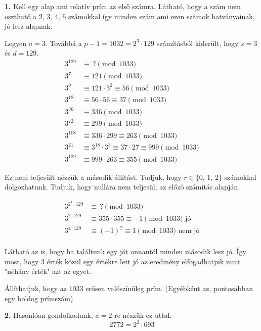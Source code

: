 \begin{solution}
\hspace{0em}\vspace{1em}

\textbf{1.} Kell egy alap ami relatív prím az első számra. Látható,
hogy a szám nem osztható a $2,\,3,\,4,\,5$ számokkal így minden szám
ami ezen számok hatványainak, jó lesz alapnak.

Legyen $a=3$. Továbbá a $p-1=1032=2^{3}\cdot129$ számításból kiderült,
hogy $s=3$ és $d=129$. 
\begin{align*}
3^{129} & \equiv\,?\pmod{1033}\\
3^{7} & \equiv121\pmod{1033}\\
3^{9} & \equiv121\cdot3^{2}\equiv56\pmod{1033}\\
3^{18} & \equiv56\cdot56\equiv37\pmod{1033}\\
3^{36} & \equiv336\pmod{1033}\\
3^{72} & \equiv299\pmod{1033}\\
3^{108} & \equiv336\cdot299\equiv263\pmod{1033}\\
3^{21} & \equiv3^{18}\cdot3^{3}\equiv37\cdot27\equiv999\pmod{1033}\\
3^{129} & \equiv999\cdot263\equiv355\pmod{1033}
\end{align*}

Ez nem teljesült nézzük a második állítást. Tudjuk, hogy $r\in\{0,\,1,\,2\}$
számokkal dolgozhatunk. Tudjuk, hogy nullára nem teljesül, az előző
számítás alapján.

\begin{align*}
3^{2^{1}\cdot129} & \equiv\,?\pmod{1033}\\
3^{2\cdot129} & \equiv355\cdot355\equiv-1\pmod{1033}\text{ jó}\\
3^{4\cdot129} & \equiv(-1)^{2}\equiv1\pmod{1033}\text{ nem jó}\\
\end{align*}

Látható az is, hogy ha találtunk egy jót onnantól minden második lesz
jó. Így most, hogy 3 érték közül egy értékre lett jó az eredmény elfogadhatjuk
mint "néhány érték" azt az egyet.

Állíthatjuk, hogy az $1033$ erősen valószínűleg prím. (Egyébként
az, pontosabban egy boldog prímszám)

\textbf{2.} Hasonlóan gondolkodunk, $a=2$-re nézzük ez úttal. 
\[
2772=2^{2}\cdot693
\]


\end{solution}
